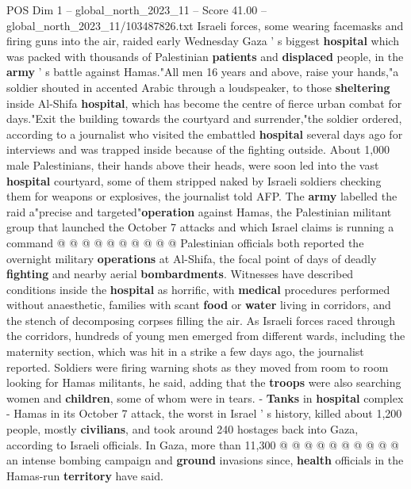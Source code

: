 \begin{textsample}{POS Dim 1 – global\_north\_2023\_11 – Score 41.00 – global\_north\_2023\_11/103487826.txt}  \label{ex:f1_pos_253}
Israeli forces, some wearing facemasks and firing guns into the air, raided early Wednesday Gaza ' s biggest \textbf{hospital} which was packed with thousands of Palestinian \textbf{patients} and \textbf{displaced} people, in the \textbf{army} ' s battle against Hamas."All men 16 years and above, raise your hands,"a soldier shouted in accented Arabic through a loudspeaker, to those \textbf{sheltering} inside Al-Shifa \textbf{hospital}, which has become the centre of fierce urban combat for days."Exit the building towards the courtyard and surrender,"the soldier ordered, according to a journalist who visited the embattled \textbf{hospital} several days ago for interviews and was trapped inside because of the fighting outside.
About 1,000 male Palestinians, their hands above their heads, were soon led into the vast \textbf{hospital} courtyard, some of them stripped naked by Israeli soldiers checking them for weapons or explosives, the journalist told AFP.
The \textbf{army} labelled the raid a"precise and targeted"\textbf{operation} against Hamas, the Palestinian militant group that launched the October 7 attacks and which Israel claims is running a command @ @ @ @ @ @ @ @ @ @ Palestinian officials both reported the overnight military \textbf{operations} at Al-Shifa, the focal point of days of deadly \textbf{fighting} and nearby aerial \textbf{bombardments}.
Witnesses have described conditions inside the \textbf{hospital} as horrific, with \textbf{medical} procedures performed without anaesthetic, families with scant \textbf{food} or \textbf{water} living in corridors, and the stench of decomposing corpses filling the air.
As Israeli forces raced through the corridors, hundreds of young men emerged from different wards, including the maternity section, which was hit in a strike a few days ago, the journalist reported.
Soldiers were firing warning shots as they moved from room to room looking for Hamas militants, he said, adding that the \textbf{troops} were also searching women and \textbf{children}, some of whom were in tears. - \textbf{Tanks} in \textbf{hospital} complex - Hamas in its October 7 attack, the worst in Israel ' s history, killed about 1,200 people, mostly \textbf{civilians}, and took around 240 hostages back into Gaza, according to Israeli officials.
In Gaza, more than 11,300 @ @ @ @ @ @ @ @ @ @ an intense bombing campaign and \textbf{ground} invasions since, \textbf{health} officials in the Hamas-run \textbf{territory} have said.

\end{textsample}

